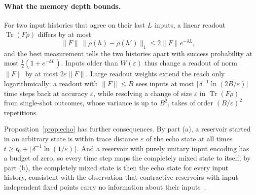\documentclass[aps,prl,twocolumn,superscriptaddress,floatfix]{revtex4-2}
\theoremstyle{plain}
\newcommand{\tr}{\operatorname{Tr}}
\newcommand{\Norm}[1]{\lVert #1\rVert}
\begin{document}
\paragraph*{What the memory depth bounds.} For two input histories that agree on their last $L$ inputs, a linear readout $\tr(F\rho)$ differs by at most
\[
\Norm F\,\Norm{\rho(h)-\rho(h')}_1\le2\Norm F e^{-\delta L},
\]
and the best measurement tells the two histories apart with success probability at most $\frac12(1+e^{-\delta L})$. Inputs older than $W(\varepsilon)$ thus change a readout of norm $\Norm F$ by at most $2\varepsilon\Norm F$. Large readout weights extend the reach only logarithmically: a readout with $\Norm F\le B$ sees inputs at most $\lceil\delta^{-1}\ln(2B/\varepsilon)\rceil$ time steps back at accuracy $\varepsilon$, while resolving a change of size $\varepsilon$ in $\tr(F\rho)$ from single-shot outcomes, whose variance is up to $B^2$, takes of order $(B/\varepsilon)^2$ repetitions.

Proposition~\ref{prop:echo} has further consequences. By part (a), a reservoir started in an arbitrary state is within trace distance $\varepsilon$ of the echo state at all times $t\ge t_0+\lceil\delta^{-1}\ln(1/\varepsilon)\rceil$. And a reservoir with purely unitary input encoding has a budget of zero, so every time step maps the completely mixed state to itself; by part (b), the completely mixed state is then the echo state for every input history, consistent with the observation that contractive reservoirs with input-independent fixed points carry no information about their inputs~\cite{MartinezPena2023}.
\end{document}
